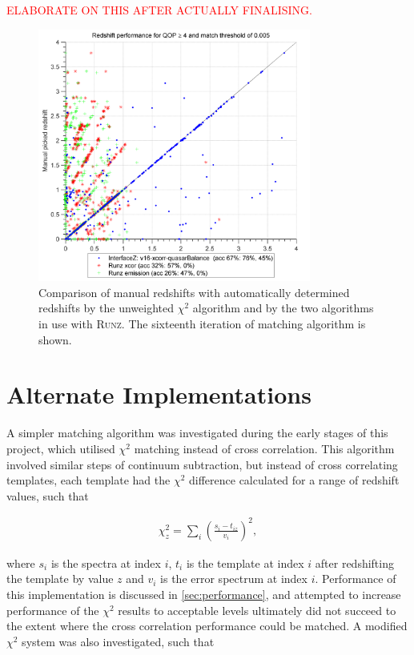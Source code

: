 \documentclass[titlesmallcaps, examinerscopy, copyrightpage]{uqthesis}
\newcommand{\runz}{\textsc{Runz}}
\newcommand{\brac}[1]{\left( #1 \right)}
\begin{document}
\textcolor{red}{ELABORATE ON THIS AFTER ACTUALLY FINALISING.}


\begin{figure}[ht!]
\includegraphics[width=0.8\textwidth]{images/final.png} 
\centering
\caption{Comparison of manual redshifts with automatically determined redshifts by the unweighted $\chi^2$ algorithm and by the two algorithms in use with \runz{}. The sixteenth iteration of matching algorithm is shown.}
\label{fig:final}
\end{figure}



\pagebreak
\section{Alternate Implementations}

A simpler matching algorithm was investigated during the early stages of this project, which utilised $\chi^2$ matching instead of cross correlation. This algorithm involved similar steps of continuum subtraction, but instead of cross correlating templates, each template had the $\chi^2$ difference calculated for a range of redshift values, such that 

\begin{align}
\chi^2_z = \sum\limits_i \brac{\frac{s_i - t_{iz}}{v_i}}^2,
\end{align}

where $s_i$ is the spectra at index $i$, $t_i$ is the template at index $i$ after redshifting the template by value $z$ and $v_i$ is the error spectrum at index $i$. Performance of this implementation is discussed in \ref{sec:performance}, and attempted to increase performance of the $\chi^2$ results to acceptable levels ultimately did not succeed to the extent where the cross correlation performance could be matched. A modified $\chi^2$ system was also investigated, such that 
\end{document}

